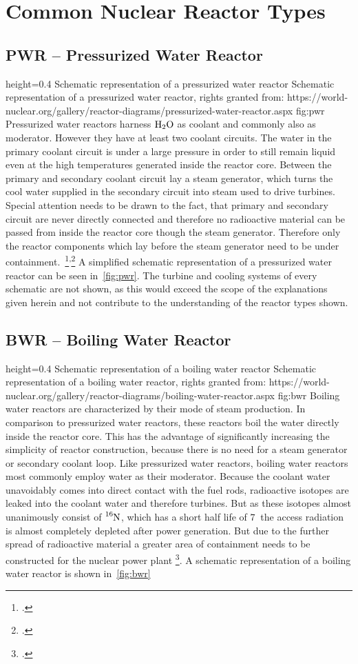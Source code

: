 \chapter{Common Nuclear Reactor Types}
\section{PWR – Pressurized Water Reactor}
    {height=0.4\textheight}
    {Schematic representation of a pressurized water reactor}
    {Schematic representation of a pressurized water reactor, rights granted from: https://world-nuclear.org/gallery/reactor-diagrams/pressurized-water-reactor.aspx}
    {fig:pwr}
Pressurized water reactors harness $\ce{H_{2}O}$ as coolant and commonly also as moderator. However they have at least
two coolant circuits. The water in the primary coolant circuit is under a large pressure in order
to still remain liquid even at the high temperatures generated inside the reactor core. Between the primary
and secondary coolant circuit lay a steam generator, which turns the cool water supplied in the secondary circuit
into steam used to drive turbines. Special attention needs to be drawn to the fact, that primary and secondary
circuit are never directly connected and therefore no radioactive material can be passed from inside the reactor core
though the steam generator. Therefore only the reactor components which lay before the steam generator
need to be under containment.~\footcite{WNPR}\textsuperscript{,}\footcite[14-84]{engHandbook} 
A simplified schematic representation of a pressurized water reactor can be seen in~\ref{fig:pwr}. The
turbine and cooling systems of every schematic are not shown, as this would exceed the scope of the
explanations given herein and not contribute to the understanding of the reactor types shown.
\pagebreak
\section{BWR – Boiling Water Reactor}
    {height=0.4\textheight}
    {Schematic representation of a boiling water reactor}
    {Schematic representation of a boiling water reactor, rights granted from: https://world-nuclear.org/gallery/reactor-diagrams/boiling-water-reactor.aspx}
    {fig:bwr}
Boiling water reactors are characterized by their mode of steam production. In comparison to pressurized
water reactors, these reactors boil the water directly inside the reactor core. This has the advantage
of significantly increasing the simplicity of reactor construction, because there is no need for a steam
generator or secondary coolant loop. Like pressurized water reactors, boiling water reactors most commonly
employ water as their moderator. Because the coolant water unavoidably comes into direct contact with
the fuel rods, radioactive isotopes are leaked into the coolant water and therefore turbines. But 
as these isotopes almost unanimously consist of $\ce{^{16}N}$, which has a short half life of $7 ~$
the access radiation is almost completely depleted after power generation. But due to the further
spread of radioactive material a greater area of containment needs to be constructed for the nuclear
power plant \footcite[85-140]{engHandbook}. A schematic representation of a boiling water reactor
is shown in~\ref{fig:bwr}
\pagebreak
